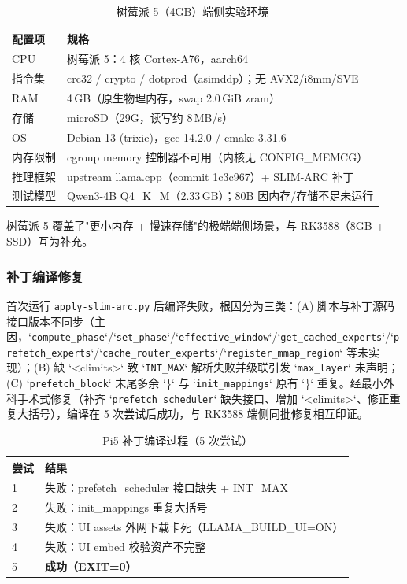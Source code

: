 \begin{table}[H]
    \centering
    \caption{树莓派 5（4GB）端侧实验环境}
    \label{tab:pi5_env}
    \begin{tabular}{ll}
        \toprule
        \textbf{配置项} & \textbf{规格} \\
        \midrule
        CPU & 树莓派 5：4 核 Cortex-A76，aarch64 \\
        指令集 & crc32 / crypto / dotprod（asimddp）；无 AVX2/i8mm/SVE \\
        RAM & 4\,GB（原生物理内存，swap 2.0\,GiB zram） \\
        存储 & microSD（29G，读写约 8\,MB/s） \\
        OS & Debian 13 (trixie)，gcc 14.2.0 / cmake 3.31.6 \\
        内存限制 & cgroup memory 控制器不可用（内核无 CONFIG\_MEMCG） \\
        推理框架 & upstream llama.cpp（commit 1c3c967）+ SLIM-ARC 补丁 \\
        测试模型 & Qwen3-4B Q4\_K\_M（2.33\,GB）；80B 因内存/存储不足未运行 \\
        \bottomrule
    \end{tabular}
\end{table}

树莓派 5 覆盖了"更小内存 + 慢速存储"的极端端侧场景，与 RK3588（8GB + SSD）互为补充。

\subsubsection{补丁编译修复}

首次运行 \texttt{apply-slim-arc.py} 后编译失败，根因分为三类：(A) 脚本与补丁源码接口版本不同步（主因，`\texttt{compute\_phase}`/`\texttt{set\_phase}`/`\texttt{effective\_window}`/`\texttt{get\_cached\_experts}`/`\texttt{prefetch\_experts}`/`\texttt{cache\_router\_experts}`/`\texttt{register\_mmap\_region}` 等未实现）；(B) 缺 `<climits>` 致 `\texttt{INT\_MAX}` 解析失败并级联引发 `\texttt{max\_layer}` 未声明；(C) `\texttt{prefetch\_block}` 末尾多余 `\}` 与 `\texttt{init\_mappings}` 原有 `\}` 重复。经最小外科手术式修复（补齐 `\texttt{prefetch\_scheduler}` 缺失接口、增加 `<climits>`、修正重复大括号），编译在 5 次尝试后成功，与 RK3588 端侧同批修复相互印证。

\begin{table}[H]
    \centering
    \caption{Pi5 补丁编译过程（5 次尝试）}
    \label{tab:pi5_build}
    \begin{tabular}{ll}
        \toprule
        \textbf{尝试} & \textbf{结果} \\
        \midrule
        1 & 失败：prefetch\_scheduler 接口缺失 + INT\_MAX \\
        2 & 失败：init\_mappings 重复大括号 \\
        3 & 失败：UI assets 外网下载卡死（LLAMA\_BUILD\_UI=ON） \\
        4 & 失败：UI embed 校验资产不完整 \\
        5 & \textbf{成功（EXIT=0）} \\
        \bottomrule
    \end{tabular}
\end{table}

